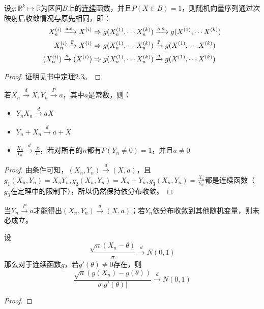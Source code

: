 \begin{theorem}[连续映射定理]\label{thm:continuous_mapping}
    设$g: \mathbb{R}^k \mapsto \mathbb{R}$为区间$B$上的\underline{连续}函数，并且$P(X \in B)=1$，则随机向量序列通过次映射后收敛情况与原先相同，即：
    \begin{align*}
        X_n^{(i)} \xrightarrow{\mathrm{a.s.}} X^{(i)}  & \Rightarrow g(X_n^{(1)},\cdots X_n^{(k)}) \xrightarrow{\mathrm{a.s.}} g(X^{(1)},\cdots X^{(k)}) \\
        X_n^{(i)} \xrightarrow{\mathbb{P}} X^{(i)}   & \Rightarrow g(X_n^{(1)},\cdots X_n^{(k)}) \xrightarrow{\mathbb{P}} g(X^{(1)},\cdots X^{(k)})  \\
        (X_n^{(i)}) \xrightarrow{d}(X^{(i)}) & \Rightarrow g(X_n^{(1)},\cdots X_n^{(k)}) \xrightarrow{d} g(X^{(1)},\cdots X^{(k)})   \\
    \end{align*}
\end{theorem}
\begin{proof}
    证明见书\cite[Asymptotic Statistics]{vaart_1998}中定理2.3。
\end{proof}

\begin{corollary}[Slutsky定理]\label{cor:Slutsky}
    若$X_n \xrightarrow{d} X, Y_n \xrightarrow{P} a$，其中$a$是常数，则：
    \begin{itemize}
        \item$Y_n X_n \xrightarrow{d} a X$
        \item$Y_n + X_n \xrightarrow{d} a + X$
        \item$\frac{X_n}{Y_n}  \xrightarrow{d} \frac{X}{a}$，若对所有的$n$都有$P(Y_n\neq 0)=1$，并且$a\neq 0$
    \end{itemize}
\end{corollary}
\begin{proof}
    由条件可知，$(X_n,Y_n) \xrightarrow{d}(X,a)$，且$g_1(X_n,Y_n)=X_n Y_n, g_2(X_n,Y_n)=X_n+Y_n, g_3(X_n,Y_n)=\frac{X_n}{Y_n}$都是连续函数（$g_3$在定理中的限制下），所以仍然保持依分布收敛。
\end{proof}
\begin{remark}
    当$Y_n \xrightarrow{P} a$才能得出$(X_n,Y_n) \xrightarrow{d}(X,a)$；若$Y_n$依分布收敛到其他随机变量，则未必成立。
\end{remark}

\begin{theorem}[theta方法的极限定理]
    设
    \[ \frac{\sqrt{n}(X_n-\theta)}{\sigma} \xrightarrow{d} N(0,1) \]
    那么对于连续函数$g$，若$g'(\theta)\neq 0$存在，则
    \[ \frac{\sqrt{n}(g(X_n)-g(\theta))}{\sigma|g'(\theta)|} \xrightarrow{d} N(0,1) \]
\end{theorem}
\begin{proof}
\end{proof}

